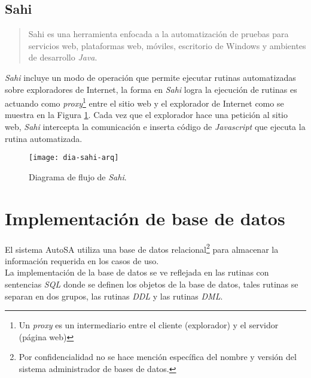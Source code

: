 \subsection{Sahi}\label{sec:sahi}
\begin{quote}
	Sahi es una herramienta enfocada a la automatización de pruebas para servicios web, plataformas web, móviles, escritorio de Windows\textsuperscript{\textcopyright} y ambientes de desarrollo \textit{Java}\cite{SahiPro}.
\end{quote}

\textit{Sahi} incluye un modo de operación que permite ejecutar rutinas automatizadas sobre exploradores de Internet, la forma en \textit{Sahi} logra la ejecución de rutinas es actuando como \textit{proxy}\footnote{Un \textit{proxy} es un intermediario entre el cliente (explorador) y el servidor (página web)\cite{BeginningUbuntuLinux}} entre el sitio web y el explorador de Internet como se muestra en la Figura \ref{fig:dia-sahi-arq}. Cada vez que el explorador hace una petición al sitio web, \textit{Sahi} intercepta la comunicación e inserta código de \textit{Javascript} que ejecuta la rutina automatizada\cite{WebEng9IntConf, SahiPro}.

\begin{figure}[h]
\centering
\texttt{[image: dia-sahi-arq]}
\caption{Diagrama de flujo de \textit{Sahi}\cite{SahiPro}.}
\label{fig:dia-sahi-arq}
\end{figure}

%

\section{Implementación de base de datos}\label{sec:impl-db}
El sistema AutoSA utiliza una base de datos relacional\footnote{Por confidencialidad no se hace mención específica del nombre y versión del sistema administrador de bases de datos.} para almacenar la información requerida en los casos de uso.\\
La implementación de la base de datos se ve reflejada en las rutinas con sentencias \textit{SQL} donde se definen los objetos de la base de datos, tales rutinas se separan en dos grupos, las rutinas \textit{DDL} y las rutinas \textit{DML}.

